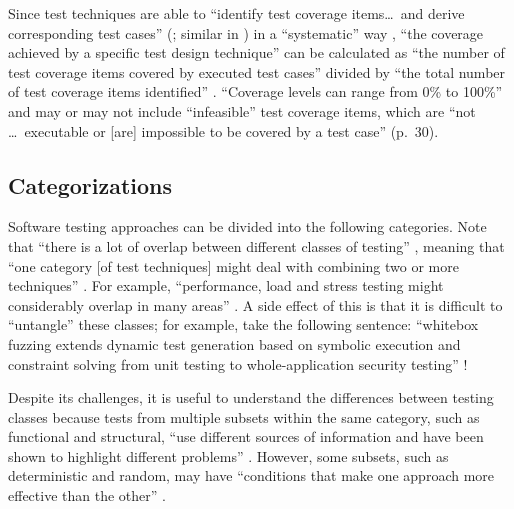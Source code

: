 \begin{landscape}
      \ieeeTestTermsTable{}
\end{landscape}

\begin{landscape}
      \otherTestTermsTable{}
\end{landscape}
\restoregeometry

Since test techniques are able to ``identify test coverage items\dots\ and
derive corresponding test cases'' (\citealp[p.~11]{IEEE2022}; similar in
\citeyear[p.~467]{IEEE2017}) in a ``systematic'' way
\citeyearpar[p.~464]{IEEE2017}, ``the coverage achieved by a specific test
design technique'' can be calculated as ``the number of test coverage items
covered by executed test cases'' divided by ``the total number of test coverage
items identified'' \citeyearpar[p.~30]{IEEE2021}. ``Coverage levels can range
from 0\% to 100\%'' and may or may not include ``infeasible'' test coverage
items, which are ``not \dots\ executable or [are] impossible to be covered by a
test case'' (p.~30).

\subsection{Categorizations}
\label{testing-categories}

Software testing approaches can be divided into the following
categories. Note that ``there is a lot of overlap between different classes of
testing'' \citep[p.~8]{Firesmith2015}, meaning that ``one category [of test
            techniques] might deal with combining two or more techniques''
\citep[p.~5-10]{SWEBOK2024}. For example, ``performance, load and stress
testing might considerably overlap in many areas'' \citep[p.~1187]{Moghadam2019}.
A side effect of this is that it is difficult to
``untangle'' these classes; for example, take the following sentence: ``whitebox
fuzzing extends dynamic test generation based on symbolic execution and
constraint solving from unit testing to whole-application security testing''
\citep[p.~23]{GodefroidAndLuchaup2011}!

Despite its challenges, it is useful to understand the differences between
testing classes because tests from multiple subsets within the same category,
such as functional and structural, ``use different sources of information and
have been shown to highlight different problems'' \citep[p.~5-16]{SWEBOK2024}.
However, some subsets, such as deterministic and random, may have ``conditions
that make one approach more effective than the other''
\citep[p.~5-16]{SWEBOK2024}.

